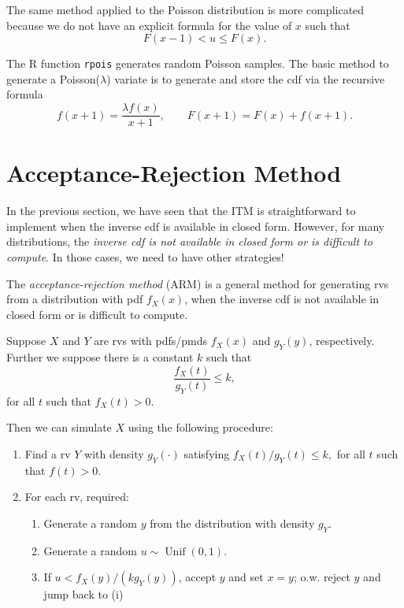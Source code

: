 \documentclass[
  letterpaper,
  DIV=11,
  numbers=noendperiod]{scrreprt}
\providecommand{\tightlist}{%
  \setlength{\itemsep}{0pt}\setlength{\parskip}{0pt}}
\begin{document}
The same method applied to the Poisson distribution is more complicated
because we do not have an explicit formula for the value of \(x\) such
that \[
F(x-1) < u \leq F(x).
\]

The R function \texttt{rpois} generates random Poisson samples. The
basic method to generate a Poisson(\(\lambda\)) variate is to generate
and store the cdf via the recursive formula \[
f(x+1) = \frac{\lambda f(x)}{x+1}, 
\qquad 
F(x+1) = F(x) + f(x+1).
\]

\section{Acceptance-Rejection Method}\label{acceptance-rejection-method}

In the previous section, we have seen that the ITM is straightforward to
implement when the inverse cdf is available in closed form. However, for
many distributions, the \emph{inverse cdf is not available in closed
form or is difficult to compute}. In those cases, we need to have other
strategies!

The \emph{acceptance-rejection method} (ARM) is a general method for
generating rvs from a distribution with pdf \(f_X(x)\), when the inverse
cdf is not available in closed form or is difficult to compute.

Suppose \(X\) and \(Y\) are rvs with pdfs/pmds \(f_X(x)\) and
\(g_Y(y)\), respectively. Further we suppose there is a constant \(k\)
such that \[
\frac{f_X(t)}{g_Y(t)} \leq k,
\] for all \(t\) such that \(f_X(t) > 0\).

Then we can simulate \(X\) using the following procedure:

\begin{enumerate}
\def\labelenumi{\arabic{enumi}.}
\item
  Find a rv \(Y\) with density \(g_Y(\cdot)\) satisfying
  \(f_X(t)/g_Y(t) \le k,\) for all \(t\) such that \(f(t) > 0\).
\item
  For each rv, required:

  \begin{enumerate}
  \def\labelenumii{(\roman{enumii})}
  \tightlist
  \item
    Generate a random \(y\) from the distribution with density \(g_Y\).
  \item
    Generate a random \(u\sim \operatorname{Unif}(0,1)\).
  \item
    If \(u < f_X(y)/(k g_Y(y))\), accept \(y\) and set \(x = y\); o.w.
    reject \(y\) and jump back to (i)
  \end{enumerate}
\end{enumerate}
\end{document}
